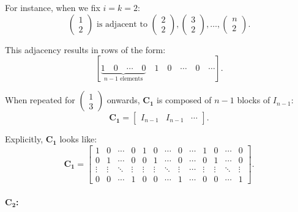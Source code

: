 \documentclass{article}
\begin{document}
For instance, when we fix \(i=k=2\):
\[
\begin{pmatrix} 1 \\ 2 \end{pmatrix} \text{ is adjacent to } \begin{pmatrix} 2 \\ 2 \end{pmatrix}, \begin{pmatrix} 3 \\ 2 \end{pmatrix}, \dots, \begin{pmatrix} n \\ 2 \end{pmatrix}.
\]

This adjacency results in rows of the form:
\[
[\underbrace{1 \quad 0 \quad \cdots \quad 0}_{n-1 \text{ elements}} \quad 1 \quad 0 \quad \cdots \quad 0 \quad \cdots].
\]

When repeated for \( \begin{pmatrix} 1 \\ 3 \end{pmatrix} \) onwards, \( \mathbf{C_1} \) is composed of \( n-1 \) blocks of \( I_{n-1} \):
\[
\mathbf{C_1} = 
\begin{bmatrix}
I_{n-1} & I_{n-1} & \cdots
\end{bmatrix}.
\]

Explicitly, \( \mathbf{C_1} \) looks like:
\[
\mathbf{C_1} = 
\begin{bmatrix}
1 & 0 & \cdots & 0 & 1 & 0 & \cdots & 0 & \cdots & 1 & 0 & \cdots & 0 \\
0 & 1 & \cdots & 0 & 0 & 1 & \cdots & 0 & \cdots & 0 & 1 & \cdots & 0 \\
\vdots & \vdots & \ddots & \vdots & \vdots & \vdots & \ddots & \vdots & \cdots & \vdots & \vdots & \ddots & \vdots \\
0 & 0 & \cdots & 1 & 0 & 0 & \cdots & 1 & \cdots & 0 & 0 & \cdots & 1
\end{bmatrix}.
\]

\paragraph{\( \mathbf{C_2} \):}
\end{document}
